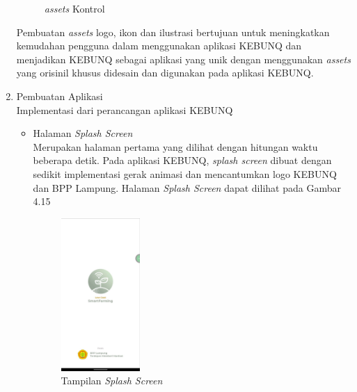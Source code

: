 \begin{flushleft}
\begin{justify}
\begin{enumerate}
\begin{figure}[ht]
                \caption{\textit{assets} Kontrol}
            \end{figure}
            \noindent Pembuatan \emph{assets} logo, ikon dan ilustrasi bertujuan untuk meningkatkan kemudahan pengguna dalam menggunakan aplikasi KEBUNQ dan menjadikan KEBUNQ sebagai aplikasi yang unik dengan menggunakan \emph{assets} yang orisinil khusus didesain dan digunakan pada aplikasi KEBUNQ. \\
            \item Pembuatan Aplikasi\\
            Implementasi dari perancangan aplikasi KEBUNQ
            \begin{itemize}
                \item Halaman \emph{Splash Screen}\\
                Merupakan halaman pertama yang dilihat dengan hitungan waktu beberapa detik. Pada aplikasi KEBUNQ, \emph{splash screen} dibuat dengan sedikit implementasi gerak animasi dan mencantumkan logo KEBUNQ dan BPP Lampung.
                Halaman \emph{Splash Screen} dapat dilihat pada Gambar 4.15
                \begin{figure}[ht]
                    \centering
                    \includegraphics[width=3cm]{images/bab 4/splash.jpeg}
                    \caption{Tampilan \emph{Splash Screen}}
                \end{figure}


\end{itemize}
\end{enumerate}
\end{justify}
\end{flushleft}
